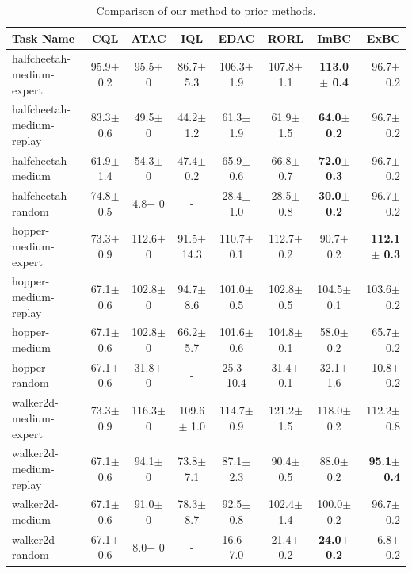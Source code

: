 \documentclass[nohyperref]{article}
\theoremstyle{plain}
\theoremstyle{definition}
\theoremstyle{remark}
\begin{document}
\begin{table}[t]
\caption{Comparison of our method to prior methods.}
\label{result-mujoco}
\vskip 0.15in
\begin{center}
\begin{small}
\begin{tabular}{l|ccccc|cr}
\toprule
Task Name & CQL & ATAC & IQL & EDAC & RORL & ImBC & ExBC \\
\midrule
halfcheetah-medium-expert    & 95.9$\pm$ 0.2& 95.5$\pm$ 0& 86.7$\pm$ 5.3&  106.3$\pm$ 1.9&  107.8$\pm$ 1.1& \bf{113.0$\pm$ 0.4}& 96.7$\pm$ 0.2 \\
halfcheetah-medium-replay    & 83.3$\pm$ 0.6& 49.5$\pm$ 0& 44.2$\pm$ 1.2&  61.3$\pm$ 1.9&  61.9$\pm$ 1.5& \bf{64.0$\pm$ 0.2}& 96.7$\pm$ 0.2 \\
halfcheetah-medium           & 61.9$\pm$ 1.4& 54.3$\pm$ 0& 47.4$\pm$ 0.2&  65.9$\pm$ 0.6&  66.8$\pm$ 0.7& \bf 72.0$\pm$ 0.3& 96.7$\pm$ 0.2 \\
halfcheetah-random           & 74.8$\pm$ 0.5& 4.8$\pm$ 0&  - &             28.4$\pm$ 1.0&  28.5$\pm$ 0.8& \bf 30.0$\pm$ 0.2& 96.7$\pm$ 0.2 \\
\midrule
hopper-medium-expert         & 73.3$\pm$ 0.9& 112.6$\pm$ 0& 91.5$\pm$ 14.3&  110.7$\pm$ 0.1&  112.7$\pm$ 0.2& 90.7$\pm$ 0.2& \bf 112.1$\pm$ 0.3 \\
hopper-medium-replay         & 67.1$\pm$ 0.6& 102.8$\pm$ 0& 94.7$\pm$ 8.6&  101.0$\pm$ 0.5&  102.8$\pm$ 0.5& 104.5$\pm$ 0.1&  103.6$\pm$ 0.2 \\
hopper-medium             & 67.1$\pm$ 0.6&    102.8$\pm$ 0&  66.2$\pm$ 5.7&  101.6$\pm$ 0.6&  104.8$\pm$ 0.1&  58.0$\pm$ 0.2& 65.7$\pm$ 0.2 \\
hopper-random             & 67.1$\pm$ 0.6&    31.8$\pm$ 0&  - &             25.3$\pm$ 10.4&  31.4$\pm$ 0.1&  32.1$\pm$ 1.6& 10.8$\pm$ 0.2\\
\midrule
walker2d-medium-expert     & 73.3$\pm$ 0.9&  116.3$\pm$ 0&  109.6$\pm$ 1.0&  114.7$\pm$ 0.9&  121.2$\pm$ 1.5&  118.0$\pm$ 0.2& 112.2$\pm$ 0.8\\
walker2d-medium-replay      & 67.1$\pm$ 0.6& 94.1$\pm$ 0& 73.8$\pm$ 7.1&  87.1$\pm$ 2.3&  90.4$\pm$ 0.5&  88.0$\pm$ 0.2& \bf95.1$\pm$ 0.4 \\
walker2d-medium            & 67.1$\pm$ 0.6&  91.0$\pm$ 0& 78.3$\pm$ 8.7&  92.5$\pm$ 0.8&  102.4$\pm$ 1.4&  100.0$\pm$ 0.2& 96.7$\pm$ 0.2 \\
walker2d-random            & 67.1$\pm$ 0.6&  8.0$\pm$ 0& - &             16.6$\pm$ 7.0&  21.4$\pm$ 0.2&  \bf 24.0$\pm$ 0.2& 6.8$\pm$ 0.2 \\

\bottomrule 
\end{tabular}
\end{small}
\end{center}
\vskip -0.1in
\end{table}
\end{document}
